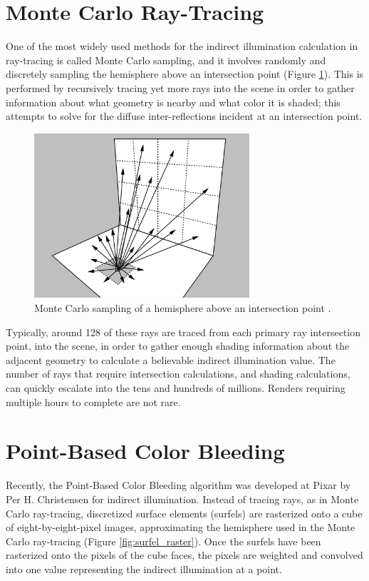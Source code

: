 \section{Monte Carlo Ray-Tracing}
\label{sec:monte_carlo}
One of the most widely used methods for the indirect illumination calculation in ray-tracing is called Monte Carlo sampling, and it involves randomly and discretely sampling the hemisphere above an intersection point (Figure \ref{fig:monte_carlo}). This is performed by recursively tracing yet more rays into the scene in order to gather information about what geometry is nearby and what color it is shaded; this attempts to solve for the diffuse inter-reflections incident at an intersection point. 

\begin{figure}[h]
   \centering
   \includegraphics[width=80mm]{../img/shirley_monte_carlo.png}
   \captionfonts
   \caption[Monte Carlo hemisphere]{Monte Carlo sampling of a hemisphere above an intersection point \cite{bib:shirley1991}.}
   \label{fig:monte_carlo}
\end{figure}

Typically, around 128 of these rays are traced from each primary ray intersection point, into the scene, in order to gather enough shading information about the adjacent geometry to calculate a believable indirect illumination value. The number of rays that require intersection calculations, and shading calculations, can quickly escalate into the tens and hundreds of millions. Renders requiring multiple hours to complete are not rare.

\section{Point-Based Color Bleeding}
Recently, the Point-Based Color Bleeding algorithm was developed at Pixar by Per H. Christensen \cite{bib:christensen2008} for indirect illumination. Instead of tracing rays, as in Monte Carlo ray-tracing, discretized surface elements (surfels) are rasterized onto a cube of eight-by-eight-pixel images, approximating the hemisphere used in the Monte Carlo ray-tracing (Figure \ref{fig:surfel_raster}). Once the surfels have been rasterized onto the pixels of the cube faces, the pixels are weighted and convolved into one value representing the indirect illumination at a point.

